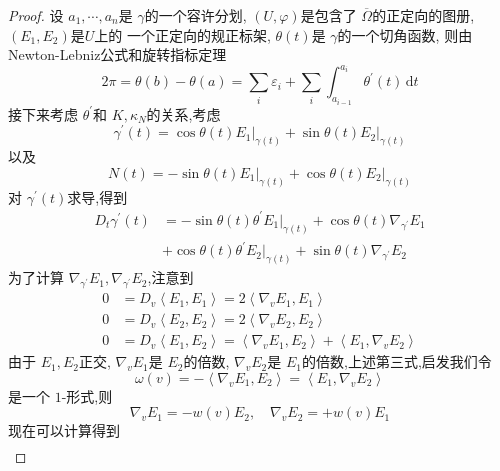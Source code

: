 \documentclass[../../几何与拓扑.tex]{subfiles}
\begin{document}
\begin{proof}
    设 \(  a_1,\cdots ,a_{n}  \)是 \(   \gamma   \)的一个容许分划, \(  \left( U, \varphi  \right)   \)是包含了 \(   \overline{ \Omega }\)的正定向的图册,  \(  \left( E_1,E_2 \right)   \)是\(  U  \)上的  一个正定向的规正标架,  \(   \theta \left( t \right)   \)是 \(   \gamma   \)的一个切角函数,  则由Newton-Lebniz公式和旋转指标定理  
    \[
    2\pi =  \theta \left( b \right)- \theta \left( a \right)=\sum _{i} \varepsilon _{i}+  \sum _{i}\int_{a_{i-1}}  ^{a_{i}} \theta ^{\prime} \left( t \right)\,\mathrm{d} t 
    \] 接下来考虑 \(   \theta ^{\prime}   \)和 \(  K, \kappa _{N}  \)的关系,考虑 \[
     \gamma ^{\prime} \left( t \right)=  \cos \theta \left( t \right)\left. E_1 \right|_{ \gamma \left( t \right) }  +\sin  \theta \left( t \right)\left. E_2 \right|_{ \gamma \left( t \right) } 
    \] 以及 \[
    N\left( t \right)= -\sin   \theta \left( t \right)\left. E_1 \right|_{ \gamma \left( t \right) }+   \cos  \theta \left( t \right) \left. E_2 \right|_{ \gamma \left( t \right) } 
    \]对 \(   \gamma ^{\prime} \left( t \right)   \)求导,得到 \[
  \begin{aligned}
    D_{t} \gamma ^{\prime} \left( t \right)&= -\sin  \theta \left( t \right) \theta ^{\prime} \left. E_1 \right|_{ \gamma \left( t \right) }+ \cos  \theta \left( t \right)  \nabla _{ \gamma ^{\prime} }E_1\\ 
     &+  \cos  \theta \left( t \right) \theta ^{\prime} \left. E_2 \right|_{ \gamma \left( t \right) }+ \sin  \theta \left( t \right) \nabla _{ \gamma ^{\prime} }E_2  
  \end{aligned}   
    \] 为了计算 \(   \nabla _{ \gamma ^{\prime} }E_1, \nabla _{ \gamma ^{\prime} }E_2  \),注意到 \[
    \begin{aligned}
    0&= D_{v}\left<E_1,E_1 \right>= 2\left< \nabla _{v}E_1,E_1 \right> \\ 
     0&= D_{v}\left<E_2,E_2 \right>= 2\left< \nabla _{v}E_2,E_2 \right>\\ 
      0&= D_{v}\left<E_1,E_2 \right>= \left< \nabla _{v}E_1,E_2 \right>+\left< E_1, \nabla _{v}E_2 \right>
    \end{aligned}
    \] 由于 \(  E_1,E_2  \)正交, \(   \nabla _{v}E_1  \)是 \(  E_2 \)的倍数, \(   \nabla _{v}E_2  \)是 \(  E_1  \)的倍数,上述第三式,启发我们令 \[
     \omega \left( v \right)=- \left< \nabla _{v}E_1,E_2 \right>= \left<E_1, \nabla _{v}E_2 \right> 
    \]  是一个 \(  1  \)-形式,则 \[
     \nabla _{v}E_1= -w\left( v \right)E_2 ,\quad  \nabla _{v}E_2= + w\left( v \right)E_1 
    \]  现在可以计算得到 \[
    \begin{aligned}

\end{aligned}\]
\end{proof}
\end{document}
